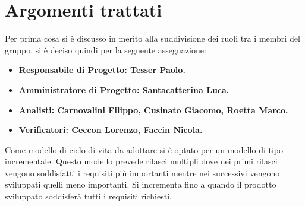 %

\section{Argomenti trattati}
	Per prima cosa si è discusso in merito alla suddivisione dei ruoli tra i membri del gruppo, si è deciso quindi per la seguente assegnazione:
		\begin{itemize}
			\item \bfseries{Responsabile di Progetto:} \textnormal{Tesser Paolo.}
			\item \bfseries{Amministratore di Progetto:} \textnormal{Santacatterina Luca.}
			\item \bfseries{Analisti:} \textnormal{Carnovalini Filippo, Cusinato Giacomo, Roetta Marco.}
			\item \bfseries{Verificatori:} \textnormal{Ceccon Lorenzo, Faccin Nicola.}
		\end{itemize}
	Come modello di ciclo di vita da adottare si è optato per un modello di tipo incrementale. Questo modello prevede rilasci multipli dove nei primi rilasci vengono soddisfatti i requisiti più importanti mentre nei successivi vengono sviluppati quelli meno importanti. Si incrementa fino a quando il prodotto sviluppato soddisferà tutti i requisiti richiesti.
